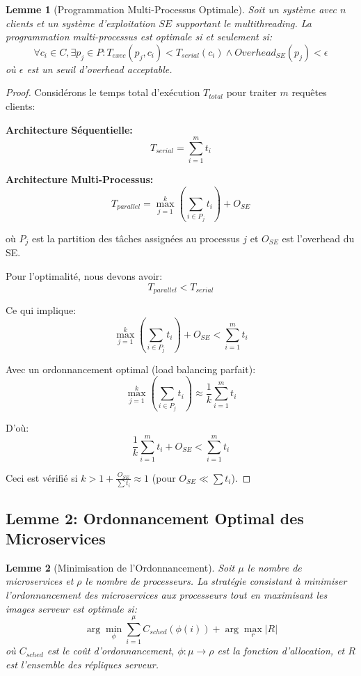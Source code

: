 \documentclass[12pt,a4paper]{article}
\newtheorem{lemma}{Lemme}
\begin{document}
\begin{lemma}[Programmation Multi-Processus Optimale]
Soit un système avec $n$ clients et un système d'exploitation $SE$ supportant le multithreading. La programmation multi-processus est optimale si et seulement si:
$$\forall c_i \in C, \exists p_j \in P : T_{exec}(p_j, c_i) < T_{serial}(c_i) \land Overhead_{SE}(p_j) < \epsilon$$
où $\epsilon$ est un seuil d'overhead acceptable.
\end{lemma}

\begin{proof}
Considérons le temps total d'exécution $T_{total}$ pour traiter $m$ requêtes clients:

\textbf{Architecture Séquentielle:}
$$T_{serial} = \sum_{i=1}^{m} t_i$$

\textbf{Architecture Multi-Processus:}
$$T_{parallel} = \max_{j=1}^{k} \left(\sum_{i \in P_j} t_i\right) + O_{SE}$$

où $P_j$ est la partition des tâches assignées au processus $j$ et $O_{SE}$ est l'overhead du SE.

Pour l'optimalité, nous devons avoir:
$$T_{parallel} < T_{serial}$$

Ce qui implique:
$$\max_{j=1}^{k} \left(\sum_{i \in P_j} t_i\right) + O_{SE} < \sum_{i=1}^{m} t_i$$

Avec un ordonnancement optimal (load balancing parfait):
$$\max_{j=1}^{k} \left(\sum_{i \in P_j} t_i\right) \approx \frac{1}{k} \sum_{i=1}^{m} t_i$$

D'où:
$$\frac{1}{k} \sum_{i=1}^{m} t_i + O_{SE} < \sum_{i=1}^{m} t_i$$

Ceci est vérifié si $k > 1 + \frac{O_{SE}}{\sum t_i} \approx 1$ (pour $O_{SE} \ll \sum t_i$).
\end{proof}

\subsection{Lemme 2: Ordonnancement Optimal des Microservices}

\begin{lemma}[Minimisation de l'Ordonnancement]
Soit $\mu$ le nombre de microservices et $\rho$ le nombre de processeurs. La stratégie consistant à minimiser l'ordonnancement des microservices aux processeurs tout en maximisant les images serveur est optimale si:
$$\arg\min_{\phi} \sum_{i=1}^{\mu} C_{sched}(\phi(i)) + \arg\max_{r} |R|$$
où $C_{sched}$ est le coût d'ordonnancement, $\phi: \mu \rightarrow \rho$ est la fonction d'allocation, et $R$ est l'ensemble des répliques serveur.
\end{lemma}
\end{document}

